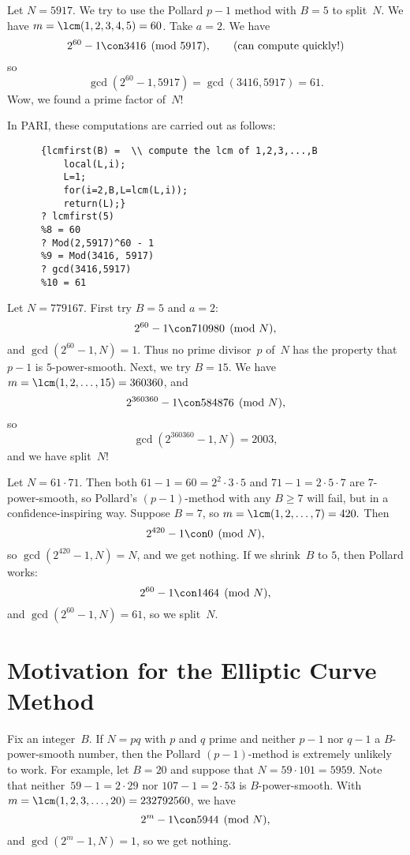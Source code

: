 \documentclass[11pt]{report}
\begin{document}
\begin{example}
  Let $N=5917$.  We try to use the Pollard $p-1$ method with
  $B=5$ to split~$N$.  We have
  $m = \lcm(1,2,3,4,5)=60$.  Take $a=2$.  We have
  $$
    2^{60} - 1 \con 3416\pmod{5917},\qquad\text{(can compute quickly!)}
  $$
  so
  $$
    \gcd(2^{60}-1,5917) = \gcd(3416,5917) = 61.
  $$
  Wow, we found a prime factor of~$N$!

  In PARI, these computations are carried out as follows:
  \begin{verbatim}
      {lcmfirst(B) =  \\ compute the lcm of 1,2,3,...,B
          local(L,i);
          L=1;
          for(i=2,B,L=lcm(L,i));
          return(L);}
      ? lcmfirst(5)
      %8 = 60
      ? Mod(2,5917)^60 - 1
      %9 = Mod(3416, 5917)
      ? gcd(3416,5917)
      %10 = 61
\end{verbatim}
\end{example}

\begin{example}
  Let $N=779167$.  First try $B=5$ and $a=2$:
  $$
    2^{60}-1 \con 710980\pmod{N},
  $$
  and $\gcd(2^{60}-1,N) = 1.$
  Thus no prime divisor~$p$ of~$N$ has the property that
  $p-1$ is $5$-power-smooth.  Next, we try $B=15$.
  We have $m=\lcm(1,2,\ldots,15)=360360$, and
  $$
    2^{360360}-1 \con 584876\pmod{N},
  $$
  so
  $$\gcd(2^{360360}-1 , N) = 2003,$$
  and we have split~$N$!
\end{example}


\begin{example}
  Let $N=61\cdot 71$.  Then both $61-1=60=2^2\cdot 3\cdot 5$
  and $71-1=2\cdot 5\cdot 7$ are $7$-power-smooth, so
  Pollard's $(p-1)$-method with any $B\geq 7$ will fail, but
  in a confidence-inspiring way.
  Suppose  $B=7$, so
  $
    m=\lcm(1,2,\ldots,7)=420.
  $
  Then
  $$
    2^{420} - 1 \con 0 \pmod{N},
  $$
  so
  $\gcd(2^{420} - 1, N) = N$,
  and we get nothing.
  If we shrink~$B$ to $5$, then Pollard works:
  $$
    2^{60} - 1\con 1464\pmod{N},
  $$
  and $\gcd(2^{60}-1,N) = 61$, so we split~$N$.
\end{example}


\section{Motivation for the Elliptic Curve Method}
Fix an integer~$B$.  If $N=pq$ with $p$ and $q$ prime and
neither $p-1$ nor $q-1$ a $B$-power-smooth number, then
the Pollard $(p-1)$-method
is extremely unlikely to work.  For example,
let $B=20$ and
suppose that $N=59\cdot 101 = 5959$.  Note that
neither~$59-1=2\cdot29$ nor $107-1=2\cdot 53$ is $B$-power-smooth.
With $m=\lcm(1,2,3,\ldots,20)=232792560$, we have
$$2^m - 1 \con 5944\pmod{N},$$
and
$\gcd(2^m-1,N)=1$, so we get nothing.
\end{document}
